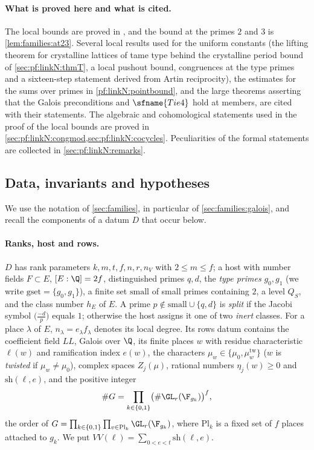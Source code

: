 \paragraph{What is proved here and what is cited.}
The local bounds are proved in , and the bound at the primes $2$ and $3$ is
\cref{lem:families:at23}. Several local results used for the uniform constants (the lifting theorem for crystalline lattices of tame
type behind the crystalline period bound of \cref{sec:pf:linkN:thmT}, a local pushout bound, congruences at the type primes and a
sixteen-step statement derived from Artin reciprocity), the estimates for the sums over primes in \cref{pf:linkN:pointbound}, and the
large theorems asserting that the Galois preconditions and $\sfname{Tie4}$ hold at members, are cited with their statements. The
algebraic and cohomological statements used in the proof of the local bounds are proved in \cref{sec:pf:linkN:congmod,sec:pf:linkN:cocycles}.
Peculiarities of the formal statements are collected in \cref{sec:pf:linkN:remarks}.

\subsection{Data, invariants and hypotheses}\label{sec:pf:linkN:data}

We use the notation of \cref{sec:families}, in particular of \cref{sec:families:galois}, and recall the components of a
datum $D$ that occur below.

\paragraph{Ranks, host and rows.}
$D$ has rank parameters $k,m,t,f,n,r,n_V$ with $2\le m\le f$; a host with number fields $F\subset E$, $[E:\Q]=2f$,
distinguished primes $q,d$, the \emph{type primes} $g_0,g_1$ (we write $\mathrm{gset}=\{g_0,g_1\}$), a finite set
$\mathrm{small}$ of small primes containing $2$, a level $Q_S$, and the class number $h_E$ of $E$. A prime
$p\notin\mathrm{small}\cup\{q,d\}$ is \emph{split} if the Jacobi symbol $\bigl(\frac{-d}{p}\bigr)$ equals $1$; otherwise the host assigns
it one of two \emph{inert} classes. For a place $\lambda$ of $E$, $n_\lambda=e_\lambda f_\lambda$ denotes its local degree. Its rows datum
contains the coefficient field $\mathit{LL}$, Galois over $\Q$, its finite places $w$ with residue characteristic
$\ell(w)$ and ramification index $e(w)$, the characters $\mu_w\in\{\mu_0,\mu^{\mathrm{tw}}_w\}$ ($w$ is \emph{twisted} if
$\mu_w\ne\mu_0$), complex spaces $Z_j(\mu)$, rational numbers $\eta_j(w)\ge0$ and $\mathrm{sh}(\ell,e)$, and the positive
integer
\begin{equation}\label{eq:pf:linkN:G}
\#G=\prod_{k\in\{0,1\}}\bigl(\#\GL_r(\F_{g_k})\bigr)^{f},
\end{equation}
the order of $G=\prod_{k\in\{0,1\}}\prod_{v\in\mathrm{Pl}_k}\GL_r(\F_{g_k})$, where $\mathrm{Pl}_k$ is a fixed set of $f$
places attached to $g_k$. We put $VV(\ell)=\sum_{0<e<t}\mathrm{sh}(\ell,e)$.

